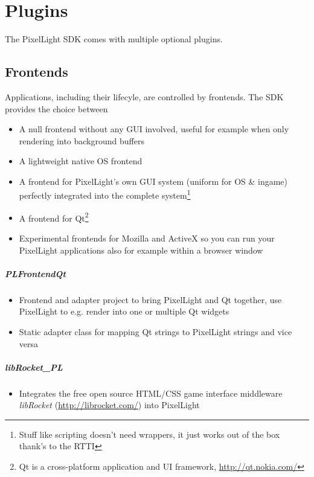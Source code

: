 \chapter{Plugins}
The PixelLight SDK comes with multiple optional plugins.




\section{Frontends}
Applications, including their lifecyle, are controlled by frontends. The SDK provides the choice between
\begin{itemize}
\item{A null frontend without any GUI involved, useful for example when only rendering into background buffers}
\item{A lightweight native OS frontend}
\item{A frontend for PixelLight's own GUI system (uniform for OS \& ingame) perfectly integrated into the complete system\footnote{Stuff like scripting doesn't need wrappers, it just works out of the box thank's to the RTTI}}
\item{A frontend for Qt\footnote{Qt is a cross-platform application and UI framework, \url{http://qt.nokia.com/}}}
\item{Experimental frontends for Mozilla and ActiveX so you can run your PixelLight applications also for example within a browser window}
\end{itemize}


\paragraph{PLFrontendQt}
\begin{itemize}
\item{Frontend and adapter project to bring PixelLight and Qt together, use PixelLight to e.g. render into one or multiple Qt widgets}
\item{Static adapter class for mapping Qt strings to PixelLight strings and vice versa}
\end{itemize}


\paragraph{libRocket\_PL}
\begin{itemize}
\item{Integrates the free open source HTML/CSS game interface middleware \emph{libRocket} (\url{http://librocket.com/}) into PixelLight}
\end{itemize}




